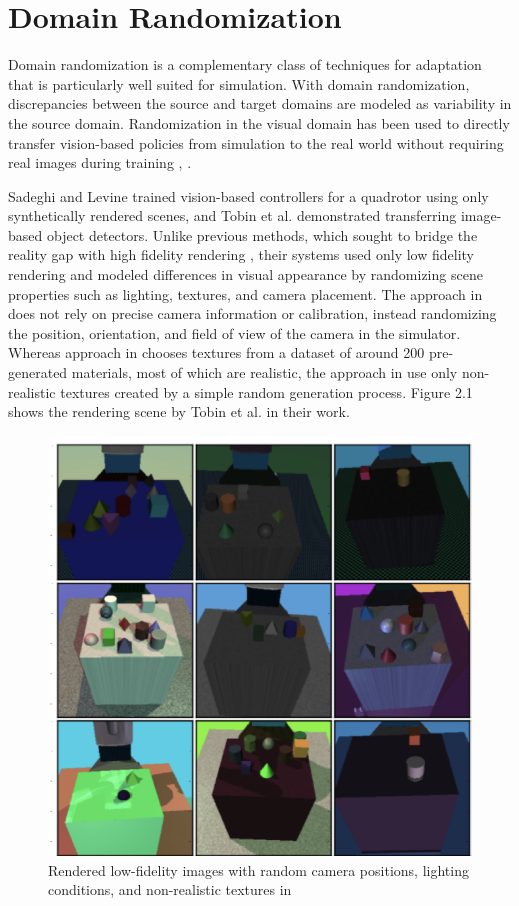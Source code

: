 \section{Domain Randomization}
Domain randomization is a complementary class of techniques for adaptation that is particularly well suited for simulation. With domain randomization, discrepancies between the source and target domains are modeled as variability in the source domain. Randomization in the visual domain has been used to directly transfer vision-based policies from simulation to the real world without requiring real images during training \cite{sadeghi2016cad2rl}, \cite{tobin2017domain}. 

Sadeghi and Levine \cite{sadeghi2016cad2rl} trained vision-based controllers for a quadrotor using only synthetically rendered scenes, and Tobin et al. \cite{tobin2017domain} demonstrated transferring image-based object detectors. Unlike previous methods, which sought to bridge the reality gap with high fidelity rendering \cite{james20163d}, their systems used only low fidelity rendering and modeled differences in visual appearance by randomizing scene properties such as lighting, textures, and camera placement. The approach in \cite{tobin2017domain} does not rely on precise camera information or calibration, instead randomizing the position, orientation, and field of view of the camera in the simulator. Whereas approach in \cite{sadeghi2016cad2rl} chooses textures from a dataset of around 200 pre-generated materials, most of which are realistic, the approach in \cite{tobin2017domain} use only non-realistic textures created by a simple random generation process. Figure 2.1 shows the rendering scene by Tobin et al. \cite{tobin2017domain} in their work.
\begin{figure}[h]
	\centering
	\includegraphics{Figures/Section2_Tobin}
	\caption{Rendered low-fidelity images with random camera positions, lighting conditions, and non-realistic textures in \cite{tobin2017domain} }
	\label{fig: tobin work}
\end{figure}

